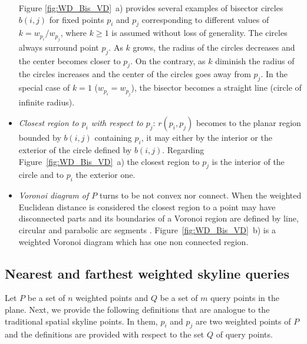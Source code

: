 \documentclass[11pt,onecolumn]{elsart3p}
\begin{document}
\begin{itemize}
        Figure \ref{fig:WD_Bis_VD}~a) provides several examples of bisector circles $b(i,j)$ for fixed points $p_i$ and $p_j$ corresponding to different values of  $k=w_{p_i}/w_{p_j}$, where $k \ge 1$ is assumed without loss of generality. The circles always surround point $p_j$. As $k$ grows, the radius of the circles decreases and the center becomes closer to $p_j$. On the contrary, as $k$ diminish the radius of the circles increases and the center of the circles goes away from $p_j$. In the special case of $k = 1$ ($w_{p_i}=w_{p_j}$), the bisector becomes a straight line (circle of infinite radius).\vspace{0.6em}

        \item {\it Closest region to $p_i$ with respect to $p_j$}: $r(p_i,p_j)$ becomes to the planar region  bounded by $b(i,j)$ containing $p_i$, it may either by the interior or the exterior of the circle defined by $b(i,j)$. Regarding Figure~\ref{fig:WD_Bis_VD}~a) the closest region to $p_j$ is the interior of the circle and to $p_i$ the exterior one.\vspace{0.6em}

        \item {\it Voronoi diagram of $P$} turns to be not convex nor connect. When the weighted Euclidean distance is considered the closest region to a point may have disconnected parts and its boundaries of a Voronoi region are defined by line, circular and parabolic arc segments \cite{AE84}. Figure~\ref{fig:WD_Bis_VD}~b) is a weighted Voronoi diagram which has one non connected region.

        \end{itemize}

        \vspace{2em}


\subsection{Nearest and farthest weighted skyline queries}

 Let $P$ be a set of $n$ weighted points and $Q$ be a set of $m$ query points in the plane. Next, we provide the following definitions that are analogue to the traditional spatial skyline points. In them,  $p_i$ and $p_j$ are two weighted points of $P$ and the definitions are provided with respect to the set $Q$ of query points. \\
\end{document}
